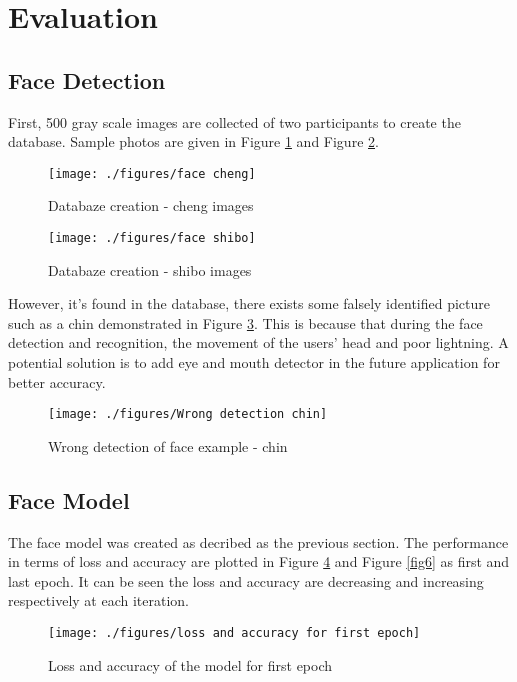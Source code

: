 \documentclass[conference]{IEEEtran}
\begin{document}
\section{Evaluation}
\subsection{Face Detection}
First, 500 gray scale images are collected of two participants to create the database. Sample photos are given in Figure \ref{fig2} and Figure \ref{fig3}.

\begin{figure}[H]
\centerline{\texttt{[image: ./figures/face cheng]}}
\caption{Databaze creation - cheng images}
\label{fig2}
\end{figure}

\begin{figure}[H]
\centerline{\texttt{[image: ./figures/face shibo]}}
\caption{Databaze creation - shibo images}
\label{fig3}
\end{figure}

However, it's found in the database, there exists some falsely identified picture such as a chin demonstrated in Figure \ref{fig4}. This is because that during the face detection and recognition, the movement of the users' head and poor lightning. A potential solution is to add eye and mouth detector in the future application for better accuracy.

\begin{figure}[H]
\centerline{\texttt{[image: ./figures/Wrong detection chin]}}
\caption{Wrong detection of face example - chin}
\label{fig4}
\end{figure}

\subsection{Face Model}
The face model was created as decribed as the previous section. The performance in terms of loss and accuracy are plotted in Figure \ref{fig5} and Figure \ref{fig6} as first and last epoch. It can be seen the loss and accuracy are decreasing and increasing respectively at each iteration. 

\begin{figure}[H]
\centerline{\texttt{[image: ./figures/loss and accuracy for first epoch]}}
\caption{Loss and accuracy of the model for first epoch}
\label{fig5}
\end{figure}
\end{document}
